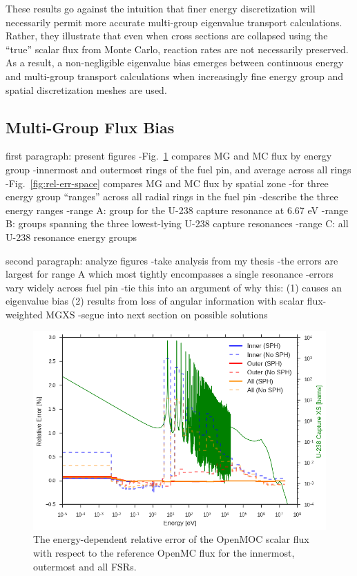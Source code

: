 These results go against the intuition that finer energy discretization will necessarily permit more accurate multi-group eigenvalue transport calculations. Rather, they illustrate that even when cross sections are collapsed using the ``true'' scalar flux from Monte Carlo, reaction rates are not necessarily preserved. As a result, a non-negligible eigenvalue bias emerges between continuous energy and multi-group transport calculations when increasingly fine energy group and spatial discretization meshes are used.



\subsection{Multi-Group Flux Bias}
\label{sec:case2-flux-bias}

first paragraph: present figures
-Fig.~\ref{fig:rel-err-energy} compares MG and MC flux by energy group
  -innermost and outermost rings of the fuel pin, and average across all rings
-Fig.~\ref{fig:rel-err-space} compares MG and MC flux by spatial zone
  -for three energy group ``ranges'' across all radial rings in the fuel pin
-describe the three energy ranges
  -range A: group for the U-238 capture resonance at 6.67 eV
  -range B: groups spanning the three lowest-lying U-238 capture resonances
  -range C: all U-238 resonance energy groups
  
second paragraph: analyze figures
-take analysis from my thesis
-the errors are largest for range A which most tightly encompasses a single resonance
-errors vary widely across fuel pin
-tie this into an argument of why this:
  (1) causes an eigenvalue bias
  (2) results from loss of angular information with scalar flux-weighted MGXS
-segue into next section on possible solutions

\begin{figure}[h!]
\centering
\includegraphics[width=\linewidth]{figures/rel-err-inner-outer}
\caption{The energy-dependent relative error of the OpenMOC scalar flux with respect to the reference OpenMC flux for the innermost, outermost and all FSRs.}
\label{fig:rel-err-energy}
\end{figure}

